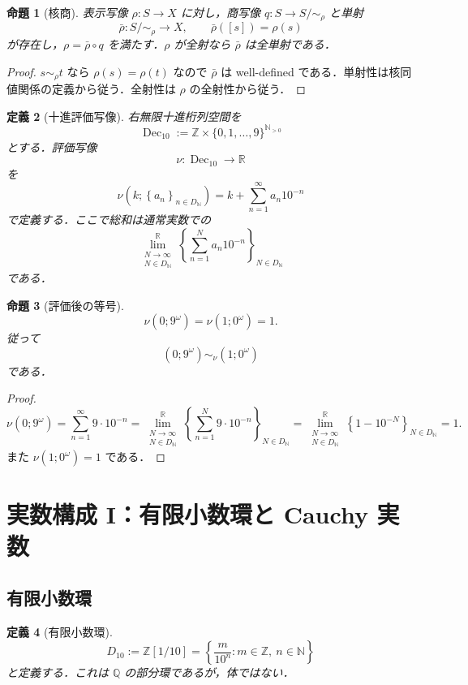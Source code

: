 \documentclass[a4paper,11pt]{ltjsarticle}
\theoremstyle{jpdef}
\newtheorem{definition}{定義}[section]
\theoremstyle{jpthm}
\newtheorem{proposition}[definition]{命題}
\newcommand{\N}{\mathbb{N}}
\newcommand{\Z}{\mathbb{Z}}
\newcommand{\Q}{\mathbb{Q}}
\newcommand{\R}{\mathbb{R}}
\newcommand{\Dec}{\operatorname{Dec}_{10}}
\newcommand{\Ns}{\N_{>0}}
\newcommand{\DN}{D_{\N}}
\newcommand{\set}[1]{\left\{#1\right\}}
\newcommand{\seq}[2]{\left\{#1\right\}_{#2}}
\begin{document}
\begin{proposition}[核商]
表示写像 \(\rho:S\to X\) に対し，商写像 \(q:S\to S/{\sim_\rho}\) と単射
\[
  \bar\rho:S/{\sim_\rho}\to X,
  \qquad
  \bar\rho([s])=\rho(s)
\]
が存在し，\(\rho=\bar\rho\circ q\) を満たす．\(\rho\) が全射なら \(\bar\rho\) は全単射である．
\end{proposition}

\begin{proof}
\(s\sim_\rho t\) なら \(\rho(s)=\rho(t)\) なので \(\bar\rho\) は well-defined である．単射性は核同値関係の定義から従う．全射性は \(\rho\) の全射性から従う．
\end{proof}

\begin{definition}[十進評価写像]
右無限十進桁列空間を
\[
  \Dec:=\Z\times\{0,1,\ldots,9\}^{\Ns}
\]
とする．評価写像
\[
  \nu:\Dec\to\R
\]
を
\[
  \nu(k;\seq{a_n}{n\in\DN})
  =k+\sum_{n=1}^{\infty}a_n10^{-n}
\]
で定義する．ここで総和は通常実数での
\[
  \lim_{\substack{N\to\infty\\ N\in\DN}}^{\R}\seq{\sum_{n=1}^{N}a_n10^{-n}}{N\in\DN}
\]
である．
\end{definition}

\begin{proposition}[評価後の等号]
\[
  \nu(0;9^\omega)=\nu(1;0^\omega)=1.
\]
従って
\[
  (0;9^\omega)\sim_\nu(1;0^\omega)
\]
である．
\end{proposition}

\begin{proof}
\[
  \nu(0;9^\omega)=\sum_{n=1}^{\infty}9\cdot10^{-n}
  =\lim_{\substack{N\to\infty\\ N\in\DN}}^{\R}\seq{\sum_{n=1}^{N}9\cdot10^{-n}}{N\in\DN}
  =\lim_{\substack{N\to\infty\\ N\in\DN}}^{\R}\seq{1-10^{-N}}{N\in\DN}=1.
\]
また \(\nu(1;0^\omega)=1\) である．
\end{proof}

\section{実数構成 I：有限小数環と Cauchy 実数}

\subsection{有限小数環}

\begin{definition}[有限小数環]
\[
  D_{10}:=\Z[1/10]
  =\set{\frac{m}{10^n}:m\in\Z,\ n\in\N}
\]
と定義する．これは \(\Q\) の部分環であるが，体ではない．
\end{definition}
\end{document}
